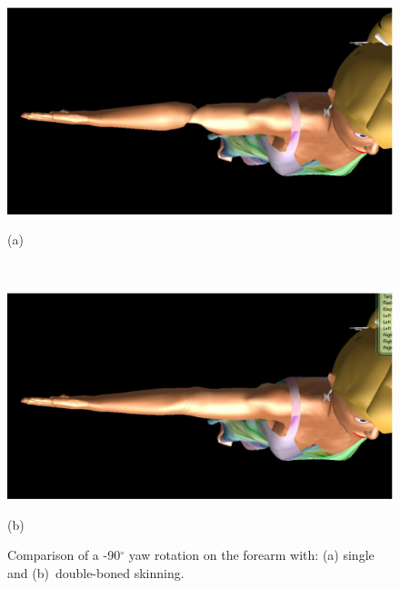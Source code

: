 \documentclass[number,preprint,review,12pt]{elsarticle}
\begin{document}
\begin{figure}[htbp]
	\centerline{\includegraphics[width=1.0\columnwidth]{fore-arm-single-bone.eps}}
	\centerline{(a)}
	\centerline{\ }
	\centerline{\includegraphics[width=1.0\columnwidth]{fore-arm-double-bone.eps}}
	\centerline{(b)}
	\caption{Comparison of a -90$^\circ$ yaw rotation on the forearm with: (a) single and (b)~double-boned skinning.}
	\label{fig:forearm-comparison}
\end{figure}
\end{document}
